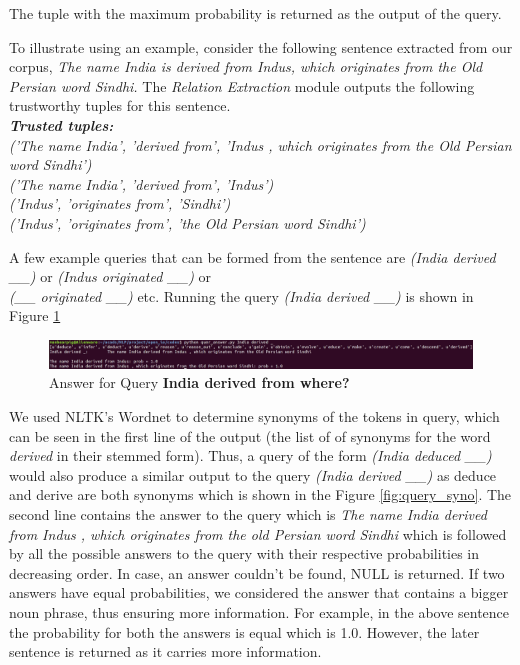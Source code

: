 \documentclass{article}
\begin{document}
The tuple with the maximum probability is returned as the output of the query.

To illustrate using an example, consider the following sentence extracted from our corpus, \textit{The name India is derived from Indus, which originates from the Old Persian word Sindhi.} The \textit{Relation Extraction} module outputs the following trustworthy tuples for this sentence.\\
\textbf{\textit{Trusted tuples:}}\\
\textit{
('The name India', 'derived from', 'Indus , which originates from the Old Persian word Sindhi')\\
('The name India', 'derived from', 'Indus')\\
('Indus', 'originates from', 'Sindhi')\\
('Indus', 'originates from', 'the Old Persian word Sindhi')}

A few example queries that can be formed from the sentence are \textit{(India derived \_\_)} or \textit{(Indus originated \_\_)} or\\ \textit{(\_\_ originated \_\_)} etc. Running the query \textit{(India derived \_\_)} is shown in Figure \ref{fig:query}

\begin{figure}[H]
\centering
\includegraphics[width=1.1\textwidth]{query.png}
\caption{Answer for Query \textbf{India derived from where?}}
\label{fig:query}
\end{figure}

We used NLTK's Wordnet \cite{Wordnet} to determine synonyms of the tokens in query, which can be seen in the first line of the output (the list of of synonyms for the word \textit{derived} in their stemmed form). Thus, a query of the form \textit{(India deduced \_\_)} would also produce a similar output to the query \textit{(India derived \_\_)} as deduce and derive are both synonyms which is shown in the Figure \ref{fig:query_syno}. The second line contains the answer to the query which is \textit{The name India derived from Indus , which originates from the old Persian word Sindhi} which is followed by all the possible answers to the query with their respective probabilities in decreasing order. In case, an answer couldn't be found, NULL is returned. If two answers have equal probabilities, we considered the answer that contains a bigger noun phrase, thus ensuring more information. For example, in the above sentence the probability for both the answers is equal which is 1.0. However, the later sentence is returned as it carries more information. 
\end{document}
